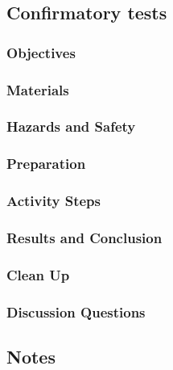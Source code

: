 \subsection{Confirmatory tests}

\subsubsection{Objectives}


\subsubsection{Materials}


\subsubsection{Hazards and Safety}


\subsubsection{Preparation}
\begin{enumerate}
\end{enumerate}

\subsubsection{Activity Steps}
\begin{enumerate}
\end{enumerate}

\subsubsection{Results and Conclusion}


\subsubsection{Clean Up}
\begin{enumerate}
\end{enumerate}


\subsubsection{Discussion Questions}
\begin{enumerate}
\end{enumerate}

\subsection{Notes}

